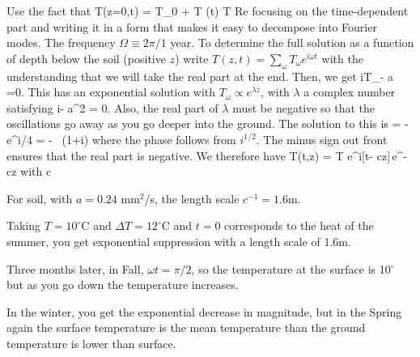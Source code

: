 \documentclass[11pt]{book}
\begin{document}
Use the fact that
\be T(z=0,t) = T_0 + \Delta T \cos(\omega t) \rightarrow \Delta T {\rm Re}
\ee
 focusing on the time-dependent part and writing it in a form that makes it easy to decompose into Fourier modes. The frequency $\Omega \equiv 2\pi/1$ year. To determine the full solution as a function of depth below the soil (positive $z$) write $T(z,t)=\sum_\omega T_\omega e^{i\omega t}$ with the understanding that we will take the real part at the end. Then, we get
\be
i\omega T_\omega - a =0.\ee
This has an exponential solution with $T_\omega \propto e^{\lambda z}$, with $\lambda$ a complex number satisfying
\be
i\omega - a\lambda^2 = 0.\ee
Also, the real part of $\lambda$ must be negative so that the oscillations go away as you go deeper into the ground. The solution to this is
\be
\lambda = -\, e^{i\pi/4} = - \, (1+i)
\ee
where the phase follows from $i^{1/2}$. The minus sign out front ensures that the real part is negative. We therefore have
\be
T(t,z) = \Delta T e^{i[\omega t- cz]}\,e^{-cz}
\ee
with
\be
c\equiv {}\ee

\bee
\item For soil, with $a=0.24$ mm$^2$/s, the length scale $c^{-1}= 1.6$m. 
\item Taking $T=10^\circ$C and $\Delta T=12^\circ$C and $t=0$ corresponds to the heat of the summer, you get exponential suppression with a length scale of 1.6m.
\item Three months later, in Fall, $\omega t=\pi/2$, so the temperature at the surface is 10$^\circ$ but as you go down the temperature increases.
\item In the winter, you get the exponential decrease in magnitude, but in the Spring again the surface temperature is the mean temperature than the ground temperature is lower than surface.
\eee



\end{document}
